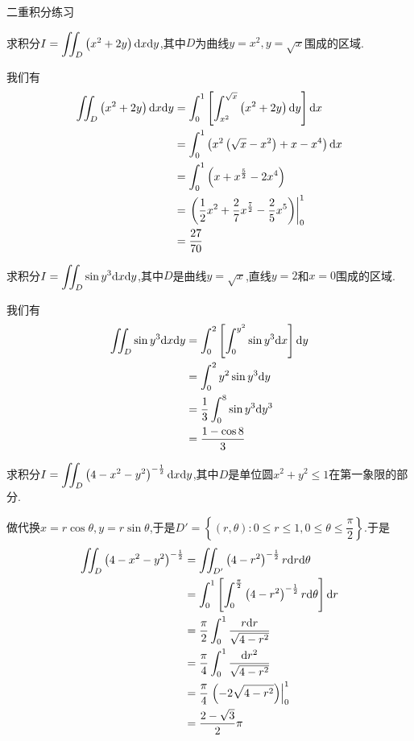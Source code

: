\documentclass{ctexart}
\begin{document}
\pagestyle{empty}
\begin{center}\large 二重积分练习\end{center}
\begin{problem}[1.]
    求积分$\displaystyle I=\iint_D\left(x^2+2y\right)\mathrm{d} x\mathrm{d} y$,其中$D$为曲线$y=x^2,y=\sqrt{x}$围成的区域.
\end{problem}
\begin{solution}
    我们有
    \[\begin{aligned}
        \iint_D\left(x^2+2y\right)\mathrm{d} x\mathrm{d} y
        &= \int_0^1\left[\int_{x^2}^{\sqrt{x}}\left(x^2+2y\right)\mathrm{d} y\right]\mathrm{d} x \\
        &= \int_0^1\left(x^2\left(\sqrt{x}-x^2\right)+x-x^4\right)\mathrm{d} x \\
        &= \int_0^1\left(x+x^{\frac52}-2x^4\right) \\
        &= \left.\left(\dfrac12x^2+\dfrac27x^{\frac72}-\dfrac25x^5\right)\right|_0^1 \\
        &= \dfrac{27}{70}
    \end{aligned}\]
\end{solution}
\begin{problem}[2.]
    求积分$\displaystyle I=\iint_D\sin y^3\mathrm{d} x\mathrm{d} y$,其中$D$是曲线$y=\sqrt x$,直线$y=2$和$x=0$围成的区域.
\end{problem}
\begin{solution}
    我们有
    \[\begin{aligned}
        \iint_D\sin y^3\mathrm{d} x\mathrm{d} y
        &= \int_0^2\left[\int_0^{y^2}\sin y^3\mathrm{d} x\right]\mathrm{d} y \\
        &= \int_0^2y^2\sin y^3\mathrm{d} y \\
        &= \dfrac13\int_0^8 \sin y^3\mathrm{d} y^3 \\
        &= \dfrac{1-\cos 8}{3}
    \end{aligned}\]
\end{solution}
\begin{problem}[3.]
    求积分$\displaystyle I=\iint_D\left(4-x^2-y^2\right)^{-\frac12}\mathrm{d} x\mathrm{d} y$,其中$D$是单位圆$x^2+y^2\leqslant1$在第一象限的部分.
\end{problem}
\begin{solution}
    做代换$x=r\cos\theta,y=r\sin\theta$,于是$D'=\left\{(r,\theta):0\leqslant r\leqslant 1,0\leqslant\theta\leqslant\dfrac\pi2\right\}$.于是
    \[\begin{aligned}
        \iint_D\left(4-x^2-y^2\right)^{-\frac{1}{2}}
        &= \iint_{D'}\left(4-r^2\right)^{-\frac12}r\mathrm{d} r\mathrm{d}\theta \\
        &= \int_0^1\left[\int_0^{\frac\pi2}\left(4-r^2\right)^{-\frac12}r\mathrm{d}\theta\right]\mathrm{d} r \\
        &= \dfrac\pi2\int_0^1\dfrac{r\mathrm{d} r}{\sqrt{4-r^2}} \\
        &= \dfrac\pi4\int_0^1\dfrac{\mathrm{d} r^2}{\sqrt{4-r^2}} \\
        &= \dfrac\pi4\left.\left(-2\sqrt{4-r^2}\right)\right|_0^1 \\
        &= \dfrac{2-\sqrt3}{2}\pi
    \end{aligned}\]
\end{solution}
\end{document}
